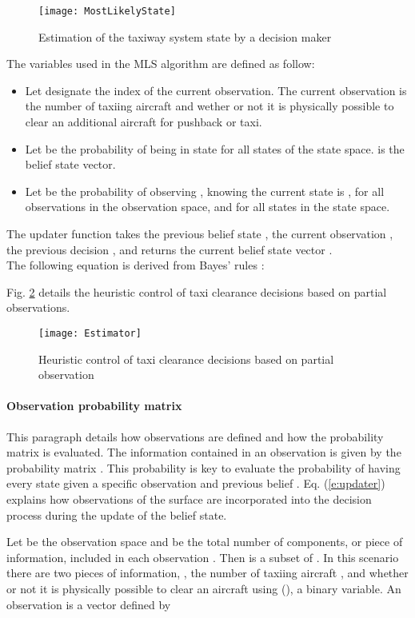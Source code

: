 \documentclass[letterpaper]{article}
\begin{document}
\begin{figure}[ht]
\centering
\texttt{[image: MostLikelyState]}
\caption{Estimation of the taxiway system state by a decision maker}
\label{MostLikelyState}
\end{figure}

The variables used in the MLS algorithm are defined as follow:
\begin{itemize}
\item Let  designate the index of the current observation. The current observation is the number of 
taxiing aircraft and wether or not it is physically possible to clear an additional aircraft for pushback or taxi.
\item Let  be the probability of being in state  for all states  of the state space.  is the belief state vector.
\item Let  be the probability of observing , knowing the current state is , for all observations  in the observation space, and for all states  in the state space.
\end{itemize}
The updater function takes the previous belief state , the current observation , the previous decision , and returns the current belief state vector  .\\ The following equation is derived from Bayes' rules \cite{Littman1994}:


Fig. \ref{estimator} details the heuristic control of taxi clearance decisions based on partial observations.

\begin{figure}[ht]
\centering
\texttt{[image: Estimator]}
\caption{Heuristic control of taxi clearance decisions based on partial observation}
\label{estimator}
\end{figure}

\paragraph{Observation probability matrix}

This paragraph details how observations are defined and how  the probability matrix  is evaluated.
The information contained in an observation is given by the probability matrix . This probability is key to evaluate the probability of having every state  given a specific observation  and previous belief . Eq. (\ref{e:updater}) explains how observations of the surface are incorporated into the decision process during the update of the belief state.

Let  be the observation space and  be the total number of components, or piece of information, included in each observation . 
Then  is a subset of . In this scenario there are two pieces of information, , the number of taxiing aircraft , 
and whether or not it is physically possible to clear an aircraft using (), a binary variable.
An observation is a vector defined by
\end{document}
